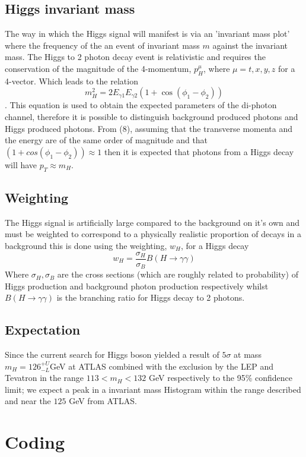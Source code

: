 \documentclass{article}
\begin{document}
\subsection{Higgs invariant mass}
The way in which the Higgs signal will manifest is via an 'invariant mass plot' where the frequency of the an event of invariant mass $m$ against the invariant mass. 
The Higgs to 2 photon decay event is relativistic and requires the conservation of the magnitude of the 4-momentum, $p_H^\mu$, where $\mu = t, x, y, z$ for a 4-vector. Which leads to the relation
\begin{equation}
m_H^2 = 2 E_{\gamma 1} E_{\gamma 2} (1 + \cos(\phi_1 - \phi_2)) 
\end{equation}.
This equation is used to obtain the expected parameters of the di-photon channel, therefore it is possible to distinguish background produced photons and Higgs produced photons. 
From (8), assuming that the transverse momenta and the energy are of the same order of magnitude and that $(1 + cos(\phi_1 - \phi_2)) \approx 1$ then it is expected that photons from a Higgs decay will have $p_T \approx m_H$.
\subsection{Weighting}
The Higgs signal is artificially large compared to the background on it's own and must be weighted to correspond to a physically realistic proportion of decays in a background this is done using the weighting, $w_H$,  for a Higgs decay
\begin{equation}
w_H = \frac{\sigma_{H}}{\sigma_{B}} B(H \rightarrow \gamma \gamma)
\end{equation}
Where $\sigma_H, \sigma_B$ are the cross sections (which are roughly related to probability) of Higgs production and background photon production respectively whilst $B(H \rightarrow \gamma \gamma)$ is the branching ratio for Higgs decay to 2 photons. 
\subsection{Expectation}
Since the current search for Higgs boson yielded a result of $5\sigma$ at mass $m_H = 126^{+ U}_{-L}$GeV at ATLAS combined with the exclusion by the LEP and Tevatron in the range $113 < m_H < 132$ GeV respectively to the 95\% confidence limit; we expect a peak in a invariant mass Histogram within the range described and near the $125$ GeV from ATLAS.
\section{Coding}
\end{document}
